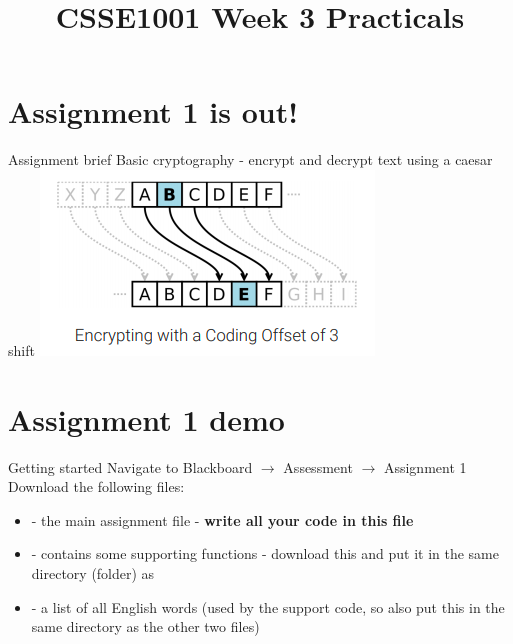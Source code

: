 \documentclass[week3]{csse1001}
\title{CSSE1001 Week 3 Practicals}
\begin{document}
\begin{frame} 
\maketitle
\end{frame}

\section{Assignment 1 is out!}

\begin{topic}{Assignment brief}
Basic cryptography - encrypt and decrypt text using a caesar shift
\includegraphics[scale=1]{encryption}
\end{topic}

\section{Assignment 1 demo}

\begin{topic}{Getting started}
Navigate to Blackboard $\to$ Assessment $\to$ Assignment 1\\
\vspace{1cm}
Download the following files:
\begin{itemize}
\item {} - the main assignment file - \textbf{write all your code in this file}
\item {} - contains some supporting functions - download this and put it in the same directory (folder) as 
\item {} - a list of all English words (used by the support code, so also put this in the same directory as the other two files)
\end{itemize}

\end{topic}
\end{document}
